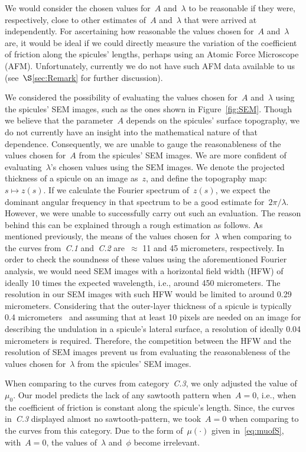 \documentclass[preprint,10pt,times]{elsarticle}
\numberwithin{equation}{section}
\begin{document}
We would consider the chosen values for~$A$ and~$\lambda$ to be
reasonable if they were, respectively, close to other estimates of~$A$
and~$\lambda$ that were arrived at independently. For ascertaining
how reasonable the values chosen for~$A$ and~$\lambda$ are, it
would be ideal if we could directly measure the variation of the coefficient
of friction along the spicules' lengths, perhaps using an Atomic Force
Microscope (AFM). Unfortunately, currently we do not have such AFM
data available to us (see~$\S$\ref{sec:Remark} for further discussion).

We considered the possibility of evaluating the values chosen for~$A$
and~$\lambda$ using the spicules' SEM images, such as the ones shown
in Figure~\ref{fig:SEM}. Though we believe that the parameter~$A$
depends on the spicules' surface topography, we do not currently have
an insight into the mathematical nature of that dependence. Consequently,
we are unable to gauge the reasonableness of the values chosen for~$A$
from the spicules' SEM images. We are more confident of evaluating~$\lambda$'s
chosen values using the SEM images. We denote the projected thickness
of a spicule on an image as~$z$, and define the topography map:~$s\mapsto z(s)$.
If we calculate the Fourier spectrum of~$z(s)$, we expect the dominant
angular frequency in that spectrum to be a good estimate for{~}$2\pi/\lambda$.
However, we were unable to successfully carry out such an evaluation.
The reason behind this can be explained through a rough estimation
as follows. As mentioned previously, the means of the values chosen
for~$\lambda$ when comparing to the curves from~\textit{C.1} and~\textit{C.2}
are{~}$\approx$ 11 and 45 micrometers, respectively.
In order to check the soundness of these values using the aforementioned
Fourier analysis, we would need SEM images with a horizontal field
width (HFW) of ideally 10 times the expected wavelength, i.e., around
450 micrometers. The resolution in our SEM images with such HFW would
be limited to around 0.29 micrometers. Considering that the outer-layer
thickness of a spicule is typically 0.4 micrometers~\cite{monn2015new}
and assuming that at least 10 pixels are needed on an image for describing
the undulation in a spicule's lateral surface, a resolution of ideally
0.04 micrometers is required. Therefore, the competition between the
HFW and the resolution of SEM images prevent us from evaluating the
reasonableness of the values chosen for~$\lambda$ from the spicules'
SEM images.

When comparing to the curves from category~\textit{C.3}, we only adjusted
the value of~$\mu_0$. Our model predicts the lack of any sawtooth
pattern when~$A=0$, i.e., when the coefficient of friction is constant
along the spicule's length. Since, the curves in~\textit{C.3} displayed
almost no sawtooth-pattern, we took~$A=0$ when comparing to the
curves from this category. Due to the form of~$\mu(\cdot)$ given
in~\eqref{eq:muofS}, with~$A=0$, the values of~$\lambda$ and~$\phi$
become irrelevant.
\end{document}
